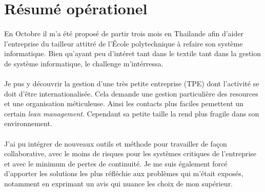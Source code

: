 \section*{Résumé opérationel}
\paragraph{}
En Octobre il m'a été proposé de partir trois mois en Thailande afin d'aider l'entreprise du tailleur attitré de l'École polytechnique à refaire son système informatique. Bien qu'ayant peu d'intéret tant dans le textile tant dans la gestion de système informatique, le challenge m'intérressa.
\paragraph{}
Je pus y découvrir la gestion d'une très petite entreprise (TPE) dont l'activité se doit d'être internationalisée. Cela demande une gestion particulière des resources et une organisation méticuleuse. Ainsi les contacts plus faciles pemettent un certain \textit{lean management}. Cependant sa petite taille la rend plus fragile dans son environnement.
\paragraph{}
J'ai pu intégrer de nouveaux outils et méthode pour travailler de façon collaborative, avec le moins de risques pour les systèmes critiques de l'entreprise et avec le minimum de pertes de continuité. Je me suis également forcé d'apporter les solutions les plus réfléchie aux problèmes qui m'était exposés, notamment en exprimant un avis qui nuance les choix de mon supérieur.

